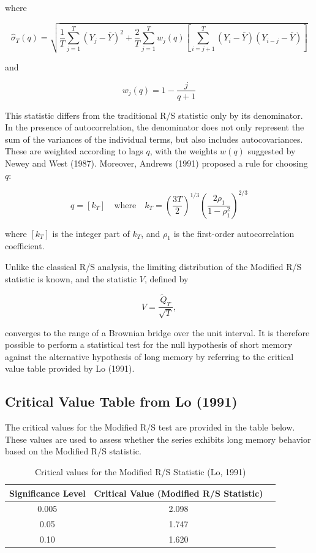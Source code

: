 \documentclass[11pt]{extarticle}
\begin{document}
where

\[
\hat{\sigma}_T(q) = \sqrt{\frac{1}{T} \sum_{j=1}^{T} (Y_j - \bar{Y})^2 + \frac{2}{T} \sum_{j=1}^{T} w_j(q) \left[ \sum_{i=j+1}^{T} (Y_i - \bar{Y})(Y_{i-j} - \bar{Y}) \right]}
\]

and

\[
w_j(q) = 1 - \frac{j}{q + 1}
\]

This statistic differs from the traditional R/S statistic only by its denominator. In the presence of autocorrelation, the denominator does not only represent the sum of the variances of the individual terms, but also includes autocovariances.
These are weighted according to lags $q$, with the weights $w(q)$ suggested by Newey and West (1987). Moreover, Andrews (1991) proposed a rule for choosing $q$:

\[
q = \left[ k_T \right] \quad \text{where} \quad k_T = \left( \frac{3T}{2} \right)^{1/3} \left( \frac{2 \rho_1}{1 - \rho_1^2} \right)^{2/3}
\]

where $[k_T]$ is the integer part of $k_T$, and $\rho_1$ is the first-order autocorrelation coefficient.

Unlike the classical R/S analysis, the limiting distribution of the Modified R/S statistic is known, and the statistic $V$, defined by

\[
V = \frac{\tilde{Q}_T}{\sqrt{T}},
\]

converges to the range of a Brownian bridge over the unit interval. It is therefore possible to perform a statistical test for the null hypothesis of short memory against the alternative hypothesis of long memory by referring to the critical value table provided by Lo (1991).

\subsection{Critical Value Table from Lo (1991)}
The critical values for the Modified R/S test are provided in the table below. These values are used to assess whether the series exhibits long memory behavior based on the Modified R/S statistic.

\begin{table}[ht!]
\centering
\begin{tabular}{|c|c|c|}
\hline
\textbf{Significance Level} & \textbf{Critical Value (Modified R/S Statistic)} \\
\hline
0.005 & 2.098\\
0.05 & 1.747\\
0.10 & 1.620\\

\hline
\end{tabular}
\caption{Critical values for the Modified R/S Statistic (Lo, 1991)}
\end{table}
\end{document}
